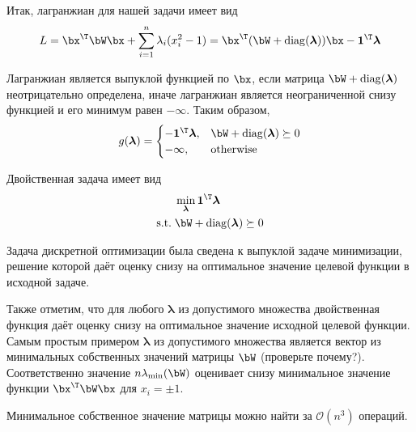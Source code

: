 \documentclass[12pt]{article}
\newcommand{\blambda}{\boldsymbol{\lambda}}
\begin{document}
\begin{enumerate}
Итак, лагранжиан  для нашей задачи имеет вид
\[
L = \bx^{\T}\bW\bx + \sum_{i=1}^n \lambda_i(x_i^2 - 1) = \bx^{\T}(\bW + \mathrm{diag} (\blambda))\bx - \mathbf{1}^{\T}\blambda
\]

Лагранжиан является выпуклой функцией по $\bx$, если матрица $\bW + \mathrm{diag} (\blambda)$ неотрицательно определена, иначе лагранжиан является неограниченной снизу функцией и его минимум равен $-\infty$.
Таким образом, 
\[
g(\blambda) = 
\begin{cases}
- \mathbf{1}^{\T}\blambda, & \bW + \mathrm{diag} (\blambda) \succeq 0\\
-\infty, & \text{otherwise}
\end{cases}
\]

Двойственная задача имеет вид
\begin{equation*}
\begin{split}
& \min_{\blambda} \mathbf{1}^{\T}\blambda\\
\mathrm{s.t.} \; & \bW + \mathrm{diag} (\blambda) \succeq 0
\end{split}
\end{equation*}

Задача дискретной оптимизации была сведена к выпуклой задаче минимизации, решение которой даёт оценку снизу на оптимальное значение целевой функции в исходной задаче.

Также отметим, что для любого $\blambda$ из допустимого множества двойственная функция даёт оценку снизу на оптимальное значение исходной целевой функции.
Самым простым примером $\blambda$ из допустимого множества является вектор из минимальных собственных значений матрицы $\bW$ (проверьте почему?).
Соответственно значение $n\lambda_{\min}(\bW)$ оценивает снизу минимальное значение функции $\bx^{\T}\bW\bx$ для $x_i = \pm 1$.

Минимальное собственное значение матрицы можно найти за $\mathcal{O}(n^3)$ операций.
\end{enumerate}
\end{document}
